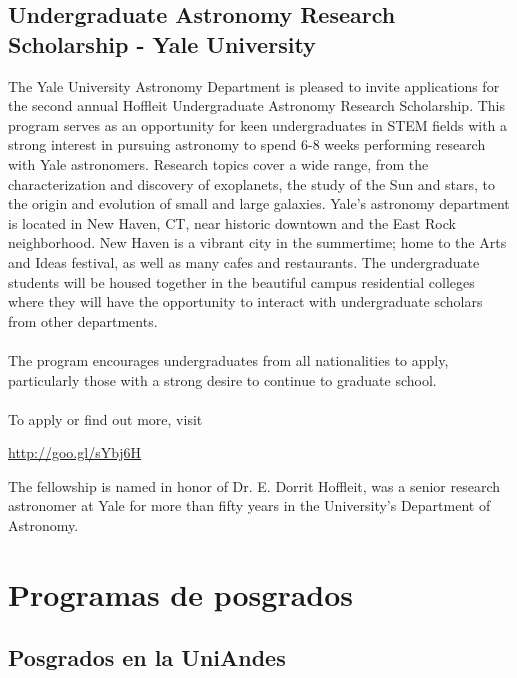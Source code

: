 \documentclass{book}
\begin{document}
\subsection{Undergraduate Astronomy Research Scholarship - Yale University}

The Yale University Astronomy Department is pleased to invite applications for the second annual Hoffleit Undergraduate Astronomy Research Scholarship. This program serves as an opportunity for keen undergraduates in STEM fields with a strong interest in pursuing astronomy to spend 6-8 weeks performing research with Yale astronomers. Research topics cover a wide range, from the characterization and discovery of exoplanets, the study of the Sun and stars, to the origin and evolution of small and large galaxies. Yale’s astronomy department is located in New Haven, CT, near historic downtown and the East Rock neighborhood. New Haven is a vibrant city in the summertime; home to the Arts and Ideas festival, as well as many cafes and restaurants. The undergraduate students will be housed together in the beautiful campus residential colleges where they will have the opportunity to interact with undergraduate scholars from other departments.\\
\\
The program encourages undergraduates from all nationalities to apply, particularly those with a strong desire to continue to graduate school.\\
\\
To apply or find out more, visit
\begin{center}
\url{http://goo.gl/sYbj6H}
\end{center}

The fellowship is named in honor of Dr. E. Dorrit Hoffleit, was a senior research astronomer at Yale for more than fifty years in the University’s Department of Astronomy.


\section*{Programas de posgrados}


\subsection{Posgrados en la UniAndes}
\end{document}

